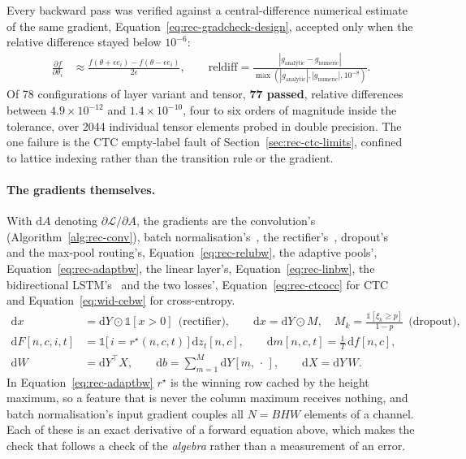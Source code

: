 Every backward pass was verified against a central-difference numerical estimate of the same gradient, Equation~\ref{eq:rec-gradcheck-design}, accepted only when the relative difference stayed below $10^{-6}$:
\begin{align}
\frac{\partial f}{\partial\theta_i}&\approx\frac{f(\theta+\epsilon e_i)-f(\theta-\epsilon e_i)}{2\epsilon},\qquad
\mathrm{reldiff}=\frac{|g_{\mathrm{analytic}}-g_{\mathrm{numeric}}|}{\max(|g_{\mathrm{analytic}}|,|g_{\mathrm{numeric}}|,10^{-8})}.\label{eq:rec-gradcheck-design}
\end{align}
Of 78 configurations of layer variant and tensor, \textbf{77 passed}, relative differences between $4.9\times10^{-12}$ and $1.4\times10^{-10}$, four to six orders of magnitude inside the tolerance, over 2044 individual tensor elements probed in double precision. The one failure is the CTC empty-label fault of Section~\ref{sec:rec-ctc-limits}, confined to lattice indexing rather than the transition rule or the gradient.

\paragraph{The gradients themselves.}
With $\mathrm dA$ denoting $\partial\mathcal L/\partial A$, the gradients are the convolution's (Algorithm~\ref{alg:rec-conv}), batch normalisation's~\cite[Alg.~1]{ioffe2015}, the rectifier's~\cite[p.~807]{nair2010}, dropout's~\cite[p.~1930]{srivastava2014} and the max-pool routing's, Equation~\ref{eq:rec-relubw}, the adaptive pools', Equation~\ref{eq:rec-adaptbw}, the linear layer's, Equation~\ref{eq:rec-linbw}, the bidirectional LSTM's~\cite{hochreiter1997} and the two losses', Equation~\ref{eq:rec-ctcocc} for CTC~\cite[p.~372]{graves2006} and Equation~\ref{eq:wid-cebw} for cross-entropy.
\begin{align}
\mathrm dx&=\mathrm dY\odot\mathbb 1[x>0]\ \ \text{(rectifier)},\qquad
\mathrm dx=\mathrm dY\odot M,\quad M_k=\frac{\mathbb 1[\xi_k\ge p]}{1-p}\ \ \text{(dropout)},\label{eq:rec-relubw}\\
\mathrm dF[n,c,i,t]&=\mathbb 1\bigl[\,i=r^{\star}(n,c,t)\,\bigr]\,\mathrm dz_t[n,c],\qquad
\mathrm dm[n,c,t]=\frac{1}{T}\,\mathrm df[n,c],\label{eq:rec-adaptbw}\\
\mathrm dW&=\mathrm dY^{\top}X,\qquad \mathrm db=\sum_{m=1}^{M}\mathrm dY[m,\,\cdot\,],\qquad \mathrm dX=\mathrm dY\,W.\label{eq:rec-linbw}
\end{align}
In Equation~\ref{eq:rec-adaptbw} $r^{\star}$ is the winning row cached by the height maximum, so a feature that is never the column maximum receives nothing, and batch normalisation's input gradient couples all $N=BHW$ elements of a channel. Each of these is an exact derivative of a forward equation above, which makes the check that follows a check of the \emph{algebra} rather than a measurement of an error.

